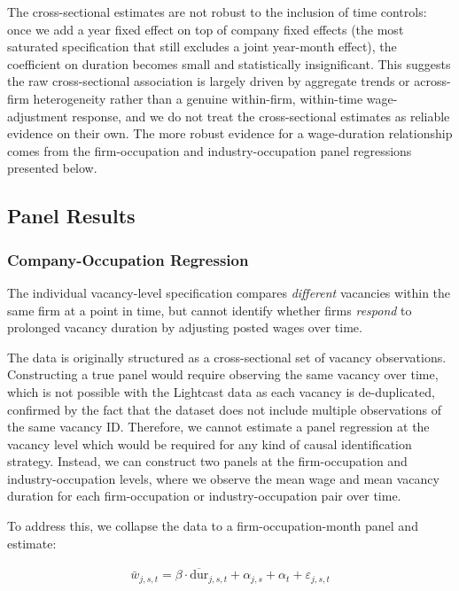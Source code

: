 The cross-sectional estimates are not robust to the inclusion of time controls: once we add a year fixed effect on top of company fixed effects (the most saturated specification that still excludes a joint year-month effect), the coefficient on duration becomes small and statistically insignificant. This suggests the raw cross-sectional association is largely driven by aggregate trends or across-firm heterogeneity rather than a genuine within-firm, within-time wage-adjustment response, and we do not treat the cross-sectional estimates as reliable evidence on their own. The more robust evidence for a wage-duration relationship comes from the firm-occupation and industry-occupation panel regressions presented below.

\subsection{Panel Results}

\subsubsection{Company-Occupation Regression}

The individual vacancy-level specification compares \emph{different} vacancies
within the same firm at a point in time, but cannot identify whether firms
\emph{respond} to prolonged vacancy duration by adjusting posted wages over time.

The data is originally structured as a cross-sectional set of vacancy observations. Constructing a true panel would require observing the same vacancy over time, which is not possible with the Lightcast data as each vacancy is de-duplicated, confirmed by the fact that the dataset does not include multiple observations of the same vacancy ID. Therefore, we cannot estimate a panel regression at the vacancy level which would be required for any kind of causal identification strategy. Instead, we can construct two panels at the firm-occupation and industry-occupation levels, where we observe the mean wage and mean vacancy duration for each firm-occupation or industry-occupation pair over time. 

To address this, we collapse the data to a firm-occupation-month panel and 
estimate:

\begin{align}
\bar{w}_{j,s,t} = \beta \cdot \overline{\text{dur}}_{j,s,t} + \alpha_{j,s} + \alpha_t + \varepsilon_{j,s,t}
\end{align}

